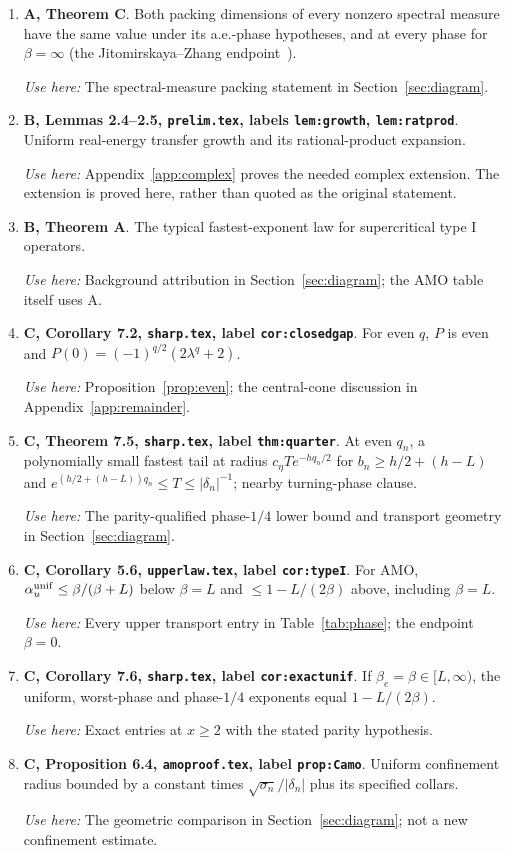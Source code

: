 \begin{enumerate}
\item \textbf{A, Theorem C}. Both packing dimensions of every nonzero spectral measure have the same value under its a.e.-phase hypotheses, and at every phase for $\beta=\infty$ (the Jitomirskaya--Zhang endpoint~\cite[Corollary~3]{JZ2022}).

\emph{Use here:} The spectral-measure packing statement in Section~\ref{sec:diagram}.

\item \textbf{B, Lemmas 2.4--2.5, \texttt{prelim.tex}, labels \texttt{lem:growth}, \texttt{lem:ratprod}}. Uniform real-energy transfer growth and its rational-product expansion.

\emph{Use here:} Appendix~\ref{app:complex} proves the needed complex extension. The extension is proved here, rather than quoted as the original statement.

\item \textbf{B, Theorem A}. The typical fastest-exponent law for supercritical type I operators.

\emph{Use here:} Background attribution in Section~\ref{sec:diagram}; the AMO table itself uses A.

\item \textbf{C, Corollary 7.2, \texttt{sharp.tex}, label \texttt{cor:closedgap}}. For even $q$, $P$ is even and $P(0)=(-1)^{q/2}(2\lambda^q+2)$.

\emph{Use here:} Proposition~\ref{prop:even}; the central-cone discussion in Appendix~\ref{app:remainder}.

\item \textbf{C, Theorem 7.5, \texttt{sharp.tex}, label \texttt{thm:quarter}}. At even $q_n$, a polynomially small fastest tail at radius $c_\eta Te^{-hq_n/2}$ for $b_n\ge h/2+(h-L)$ and $e^{(h/2+(h-L))q_n}\le T\le|\delta_n|^{-1}$; nearby turning-phase clause.

\emph{Use here:} The parity-qualified phase-$1/4$ lower bound and transport geometry in Section~\ref{sec:diagram}.

\item \textbf{C, Corollary 5.6, \texttt{upperlaw.tex}, label \texttt{cor:typeI}}. For AMO, $\alpha_u^{\rm unif}\le\beta/(\beta+L)$ below $\beta=L$ and $\le1-L/(2\beta)$ above, including $\beta=L$.

\emph{Use here:} Every upper transport entry in Table~\ref{tab:phase}; the endpoint $\beta=0$.

\item \textbf{C, Corollary 7.6, \texttt{sharp.tex}, label \texttt{cor:exactunif}}. If $\beta_e=\beta\in[L,\infty)$, the uniform, worst-phase and phase-$1/4$ exponents equal $1-L/(2\beta)$.

\emph{Use here:} Exact entries at $x\ge2$ with the stated parity hypothesis.

\item \textbf{C, Proposition 6.4, \texttt{amoproof.tex}, label \texttt{prop:Camo}}. Uniform confinement radius bounded by a constant times $\sqrt{\sigma_n}/|\delta_n|$ plus its specified collars.

\emph{Use here:} The geometric comparison in Section~\ref{sec:diagram}; not a new confinement estimate.
\end{enumerate}

